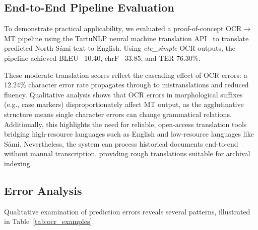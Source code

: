 \documentclass[conference]{IEEEtran}
\newcommand{\ctcCER}{12.24}
\newcommand{\bleuScore}{10.40}
\newcommand{\chrfScore}{33.85}
\newcommand{\terScore}{76.30}
\begin{document}
\subsection{End-to-End Pipeline Evaluation}
\label{subsec:pipeline}

To demonstrate practical applicability, we evaluated a proof-of-concept OCR$\rightarrow$MT pipeline using the TartuNLP neural machine translation API~\cite{tartunlp} to translate predicted North S\'{a}mi text to English. Using \textit{ctc\_simple} OCR outputs, the pipeline achieved BLEU~\cite{post2018call} \bleuScore{}, chrF~\cite{popovic2015chrf} \chrfScore{}, and TER \terScore{}\%.

These moderate translation scores reflect the cascading effect of OCR errors: a \ctcCER\% character error rate propagates through to mistranslations and reduced fluency.
Qualitative analysis shows that OCR errors in morphological suffixes (e.g., case markers) disproportionately affect MT output, as the agglutinative structure means single character errors can change grammatical relations.
Additionally, this highlights the need for reliable, open-access translation tools bridging high-resource languages such as English and low-resource languages like S\'{a}mi. Nevertheless, the system can process historical documents end-to-end without manual transcription, providing rough translations suitable for archival indexing.


\subsection{Error Analysis}
\label{sec:error_analysis}

Qualitative examination of prediction errors reveals several patterns, illustrated in Table~\ref{tab:ocr_examples}.
\end{document}
